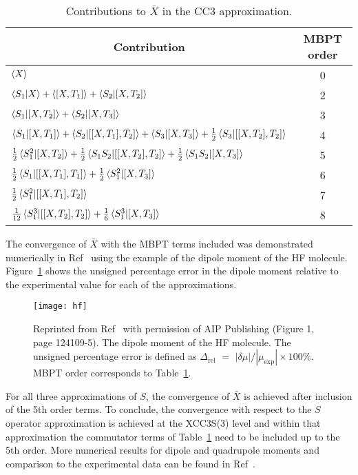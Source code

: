 \documentclass[preprint,12pt]{elsarticle}
\newcommand{\errname}{$\Delta_\mathrm{rel}$}
\newcommand{\relerror}{$|\delta \mu|/|\mu_\mathrm{exp}| \times 100 \% $}
\newcommand{\Frt}[1]{Table~\ref{#1}}
\newcommand{\Frf}[1]{Figure~\ref{#1}}
\begin{document}
\begin{table}[!ht]
  \begin{center}
   \begin{threeparttable}
     \caption{Contributions to $\bar{X}$ in the CC3 approximation.}
     \label{Th-Fo-av}
\linespread{1.2}
\begin{tabular}{lc}
    \multicolumn{1}{c}{Contribution}
    &   \multicolumn{1}{c}{MBPT order}\\
  \hline
  $\braket{X}$ & 0\\
  $\braket{S_1|X}+ \braket{[X, T_1]} +\braket{S_2|[X, T_2]}$&2\\
  $\braket{S_1|[X, T_2]}+ \braket{S_2|[X, T_3]}$&3\\
   $\braket{S_1|[X, T_1]}+\braket{S_2|[[X, T_1], T_2]}+\braket{S_3|[X, T_3]}+\frac12\braket{S_3|[[X, T_2], T_2]}$&4\\
$\frac12\braket{S_1^2|[X, T_2]}+\frac12\braket{S_1S_2|[[X, T_2], T_2]}+\frac12\braket{S_1S_2|[X, T_3]}$&5\\
$\frac12\braket{S_1|[[X, T_1], T_1]}+\frac12\braket{S_1^2|[X, T_3]}$&6\\
$\frac12\braket{S_1^2|[[X, T_1], T_2]}$&7\\
$\frac{1}{12}\braket{S_1^3|[[X, T_2], T_2]}+\frac16\braket{S_1^3|[X, T_3]}$&8
\end{tabular}
   \end{threeparttable}
    \end{center}
\end{table}
The convergence of $\bar{X}$ with the MBPT terms
included was demonstrated numerically in Ref~\citep{tucholska2014transition} using
the example of the dipole moment of the HF molecule. \Frf{tab2} shows the  
 unsigned percentage error  in the dipole moment 
 relative to the experimental value 
 for each of the approximations.
\begin{figure}[!ht]
  \begin{center}
    \texttt{[image: hf]}
    \caption{Reprinted from Ref~\citep{tucholska2014transition} with permission of AIP Publishing (Figure 1, page 124109-5).
      The dipole moment of the HF molecule. The  unsigned percentage error is defined as {\errname} $ = $ {\relerror}.
      MBPT order corresponds to \Frt{Th-Fo-av}.
      }
    \label{tab2}
    \end{center}
\end{figure}
For all three approximations of $S$, the convergence of $\bar{X}$
is achieved after inclusion of the 5th order terms.
To conclude, the convergence with respect to the $S$ operator approximation is achieved at the XCC3S(3) level and
within that approximation the commutator terms of \Frt{Th-Fo-av} need to be included up to the 5th order.
More numerical results for dipole and quadrupole moments and comparison to the experimental data
can be found in Ref~\citep{tucholska2014transition}.
\end{document}
